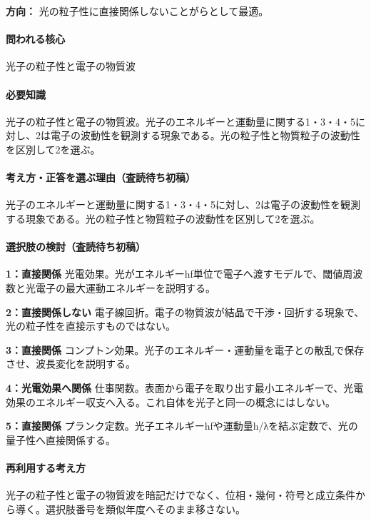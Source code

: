 \noindent\textbf{方向：} 光の粒子性に直接関係しないことがらとして最適。\par

\paragraph{問われる核心} 光子の粒子性と電子の物質波

\paragraph{必要知識} 光子の粒子性と電子の物質波。光子のエネルギーと運動量に関する1・3・4・5に対し、2は電子の波動性を観測する現象である。光の粒子性と物質粒子の波動性を区別して2を選ぶ。

\paragraph{考え方・正答を選ぶ理由（査読待ち初稿）} 光子のエネルギーと運動量に関する1・3・4・5に対し、2は電子の波動性を観測する現象である。光の粒子性と物質粒子の波動性を区別して2を選ぶ。

\paragraph{選択肢の検討（査読待ち初稿）}\mbox{}\par

\noindent\textbf{1：直接関係} 光電効果。光がエネルギーhf単位で電子へ渡すモデルで、閾値周波数と光電子の最大運動エネルギーを説明する。\par

\noindent\textbf{2：直接関係しない} 電子線回折。電子の物質波が結晶で干渉・回折する現象で、光の粒子性を直接示すものではない。\par

\noindent\textbf{3：直接関係} コンプトン効果。光子のエネルギー・運動量を電子との散乱で保存させ、波長変化を説明する。\par

\noindent\textbf{4：光電効果へ関係} 仕事関数。表面から電子を取り出す最小エネルギーで、光電効果のエネルギー収支へ入る。これ自体を光子と同一の概念にはしない。\par

\noindent\textbf{5：直接関係} プランク定数。光子エネルギーhfや運動量h/λを結ぶ定数で、光の量子性へ直接関係する。\par

\paragraph{再利用する考え方} 光子の粒子性と電子の物質波を暗記だけでなく、位相・幾何・符号と成立条件から導く。選択肢番号を類似年度へそのまま移さない。

